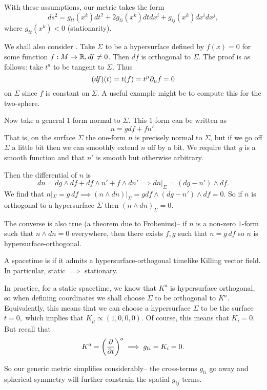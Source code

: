 With these assumptions, our metric takes the form
\begin{equation*}
    ds^2 = g_{tt}(x^k)dt^2 +2g_{ti}(x^k) dt dx^i+ g_{ij}(x^k)dx^i dx^j,
\end{equation*}
where $g_{tt}(x^k)<0$ (stationarity).

We shall also consider . Take $\Sigma$ to be a hypersurface defined by $f(x)=0$ for some function $f:M\to \RR, df\neq 0$. Then $df$ is orthogonal to $\Sigma$. The proof is as follows: take $t^a$ to be tangent to $\Sigma$. Thus
\begin{equation*}
    (df)(t)=t(f)=t^\mu \p_\mu f = 0
\end{equation*}
on $\Sigma$ since $f$ is constant on $\Sigma.$ A useful example might be to compute this for the two-sphere.

Now take a general $1$-form normal to $\Sigma$. This $1$-form can be written as
\begin{equation}
    n= gdf +f n'.
\end{equation}
That is, on the surface $\Sigma$ the one-form $n$ is precisely normal to $\Sigma$, but if we go off $\Sigma$ a little bit then we can smoothly extend $n$ off by a bit. We require that $g$ is a smooth function and that $n'$ is smooth but otherwise arbitrary.

Then the differential of $n$ is
\begin{equation*}
    dn=dg\wedge df + df \wedge n' + f \wedge dn' \implies dn|_\Sigma = (dg-n') \wedge df.
\end{equation*}
We find that $n|_\Sigma= g\, df \implies (n\wedge dn)|_\Sigma = gdf \wedge (dg-n') \wedge df =0$. So if $n$ is orthogonal to a hypersurface $\Sigma$ then $(n\wedge dn)_\Sigma =0$.


The converse is also true (a theorem due to Frobenius)-- if $n$ is a non-zero $1$-form such that $n\wedge dn=0$ everywhere, then there exists $f,g$ such that $n=g\, df$ so $n$ is hypersurface-orthogonal.

\begin{defn}
    A spacetime is  if it admits a hypersurface-orthogonal timelike Killing vector field. In particular, static $\implies$ stationary.
\end{defn}

In practice, for a static spacetime, we know that $K^a$ is hypersurface orthogonal, so when defining coordinates we shall choose $\Sigma$ to be orthogonal to $K^a$. Equivalently, this means that we can choose a hypersurface $\Sigma$ to be the surface $t=0,$ which implies that $K_\mu \propto (1,0,0,0)$. Of course, this means that $K_i=0$. But recall that
\begin{equation*}
    K^a= \left(\P{}{t}\right)^a \implies g_{ti}=K_i=0.
\end{equation*}

So our generic metric simplifies considerably-- the cross-terms $g_{ti}$ go away and spherical symmetry will further constrain the spatial $g_{ij}$ terms.